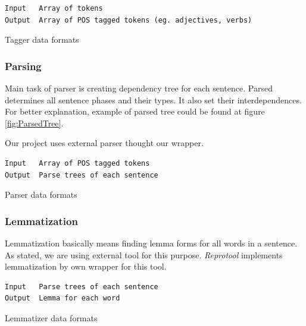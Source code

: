\begin{table}[ht]   %
\begin{center}
    \begin{verbatim}
Input 	Array of tokens
Output 	Array of POS tagged tokens (eg. adjectives, verbs) 
        \end{verbatim}
  \caption{Tagger data formats}
  \label{tab.tagging}
\end{center}
\end{table} 

\subsubsection{Parsing}
Main task of parser is creating dependency tree for each sentence. Parsed determines all sentence phases and their types. It also set their interdependences. For better explanation, example of parsed tree could be found at figure \ref{fig:ParsedTree}.

Our project uses external parser thought our wrapper. 

\begin{table}[ht]   %
\begin{center}
    \begin{verbatim}
Input 	Array of POS tagged tokens
Output 	Parse trees of each sentence 
        \end{verbatim}
  \caption{Parser data formats}
  \label{tab.parsing}
\end{center}
\end{table}  

\subsubsection{Lemmatization}
Lemmatization basically means finding lemma forms for all words in a sentence. As stated, we are using external tool for this purpose. \emph{Reprotool} implements lemmatization by own wrapper for this tool.
\begin{table}[ht]   %
\begin{center}
    \begin{verbatim}
Input 	Parse trees of each sentence
Output 	Lemma for each word 
        \end{verbatim}
  \caption{Lemmatizer data formats}
  \label{tab.lemmatizer}
\end{center}
\end{table} 

